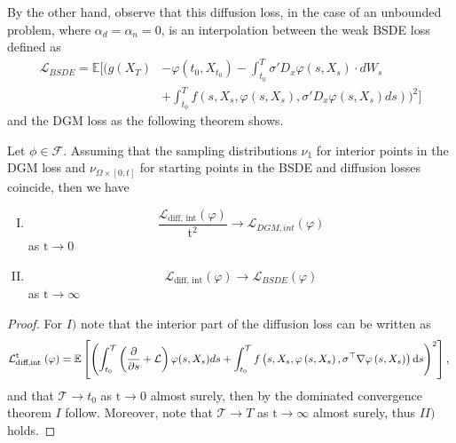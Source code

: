 By the other hand, observe that this diffusion loss, in the case of an unbounded problem, where $\alpha_d=\alpha_n=0$, is an interpolation between the weak BSDE loss defined as
\begin{equation}
	\begin{aligned}
			\mathcal{L}_{BSDE}=\mathbb{E}\Big[\Big(g(X_T)&-\varphi(t_0,X_{t_0})-\int_{t_0}^{T}\sigma'D_x \varphi (s,X_s)\cdot dW_s\\ &+\int_{t_0}^{T}f(s,X_s,\varphi(s,X_s),\sigma'D_x \varphi(s,X_s)ds)\Big)^2\Big]
	\end{aligned}
\end{equation}
and the DGM loss as the following theorem shows.
\begin{theorem}
	Let $\phi\in \mathcal{F}$. Assuming that the sampling distributions $\nu_1$ for interior points in the DGM loss and $\nu_{\Omega\times [0,t]}$ for starting points in the BSDE and diffusion losses coincide, then we have 
	\begin{enumerate}[I.]
		\item \begin{equation}
			\frac{\mathcal{L}_{\text{diff, int}}(\varphi)}{\mathrm{t}^2}\to \mathcal{L}_{DGM,int}(\varphi)
		\end{equation} as $\mathrm{t}\to 0$
		\item \begin{equation}
			\mathcal{L}_{\text{diff, int}}(\varphi)\to \mathcal{L}_{BSDE}(\varphi)
		\end{equation} as $\mathrm{t}\to \infty$
	\end{enumerate} 
\end{theorem}
\begin{proof}
	For $I)$ note that the interior part of the diffusion loss can be written as 
	\begin{equation}
		\mathcal{L}_{\text {diff,int }}^{\mathrm{t}}(\varphi)=\mathbb{E}\left[\left(\int_{t_0}^{\mathcal{T}}\left(\frac{\partial }{\partial s}+\mathcal{L}\right)\varphi(s,X_s)ds
		+\int_{t_0}^{\mathcal{T}} f\left(s,X_s, \varphi\left(s,X_s\right), \sigma^{\top} \nabla \varphi\left(s,X_s\right)\right) \mathrm{d} s\right)^2\right] \text {, }
	\end{equation} and that $\mathcal{T}\to t_0$ as $\mathrm{t}\to 0$ almost surely, then by the dominated convergence theorem $I$ follow. Moreover, note that $\mathcal{T}\to T$ as $\mathrm{t}\to\infty$ almost surely, thus $II)$  holds.
\end{proof}

